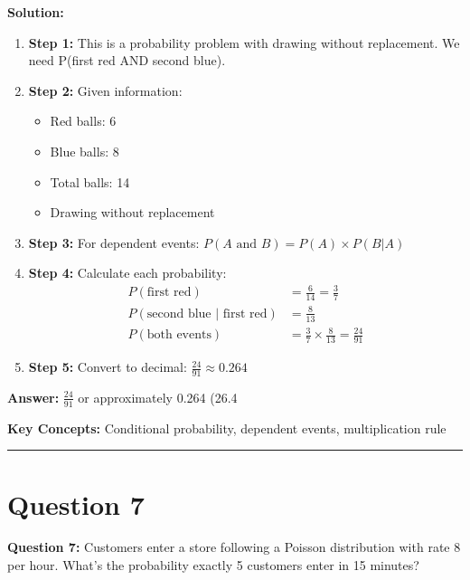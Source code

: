 \documentclass[12pt]{article}
\begin{document}
\textbf{Solution:}
\begin{enumerate}
\item \textbf{Step 1:} This is a probability problem with drawing without replacement. We need P(first red AND second blue).

\item \textbf{Step 2:} Given information:
\begin{itemize}
\item Red balls: 6
\item Blue balls: 8
\item Total balls: 14
\item Drawing without replacement
\end{itemize}

\item \textbf{Step 3:} For dependent events: $P(A \text{ and } B) = P(A) \times P(B|A)$

\item \textbf{Step 4:} Calculate each probability:
\begin{align}
P(\text{first red}) &= \frac{6}{14} = \frac{3}{7} \\
P(\text{second blue | first red}) &= \frac{8}{13} \\
P(\text{both events}) &= \frac{3}{7} \times \frac{8}{13} = \frac{24}{91}
\end{align}

\item \textbf{Step 5:} Convert to decimal: $\frac{24}{91} \approx 0.264$
\end{enumerate}

\textbf{Answer:} $\frac{24}{91}$ or approximately 0.264 (26.4%

\textbf{Key Concepts:} Conditional probability, dependent events, multiplication rule

\hrule
\vspace{1em}

\newpage

\section{Question 7}

\textbf{Question 7:} Customers enter a store following a Poisson distribution with rate 8 per hour. What's the probability exactly 5 customers enter in 15 minutes?
\end{document}
